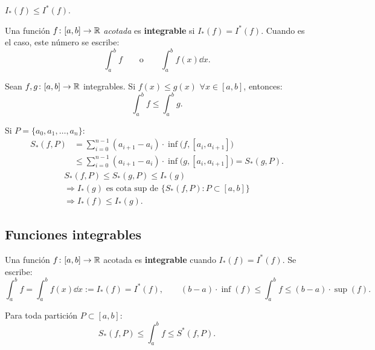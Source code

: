 \documentclass[11pt,a4paper]{article}
\begin{document}
\begin{proposicion}
$I_*(f)\le I^*(f)$.
\end{proposicion}

\begin{definicion}
Una función $f\colon[a,b]\to\mathbb{R}$ \emph{acotada} es \textbf{integrable} si $I_*(f)=I^*(f)$.
Cuando es el caso, este número se escribe:
\[
  \int_a^b f \qquad\text{o}\qquad \int_a^b f(x)\dd x.
\]
\end{definicion}

\begin{proposicion}
Sean $f,g\colon[a,b]\to\mathbb{R}$ integrables. Si $f(x)\le g(x)$ $\forall x\in[a,b]$, entonces:
\[
  \int_a^b f\le\int_a^b g.
\]
\end{proposicion}

\begin{demo}
Si $P=\{a_0,a_1,\dots,a_n\}$:
\begin{align*}
  S_*(f,P) &= \sum_{i=0}^{n-1}(a_{i+1}-a_i)\cdot\inf\bigl(f,[a_i,a_{i+1}]\bigr)\\
  &\le \sum_{i=0}^{n-1}(a_{i+1}-a_i)\cdot\inf\bigl(g,[a_i,a_{i+1}]\bigr) = S_*(g,P).
\end{align*}
\begin{gather*}
  S_*(f,P)\le S_*(g,P)\le I_*(g)\\
  \Rightarrow I_*(g) \text{ es cota sup de } \{S_*(f,P) : P\subset[a,b]\}\\
  \Rightarrow I_*(f)\le I_*(g).
\end{gather*}
\end{demo}


\subsection{Funciones integrables}

\begin{definicion}
Una función $f\colon[a,b]\to\mathbb{R}$ acotada es \textbf{integrable} cuando $I_*(f)=I^*(f)$. Se escribe:
\[
  \int_a^b f=\int_a^b f(x)\dd x := I_*(f)=I^*(f),
  \qquad (b-a)\cdot\inf(f)\le\int_a^b f\le(b-a)\cdot\sup(f).
\]
\end{definicion}

\begin{observacion}
Para toda partición $P\subset[a,b]$:
\[
  S_*(f,P)\le\int_a^b f\le S^*(f,P).
\]
\end{observacion}
\end{document}
